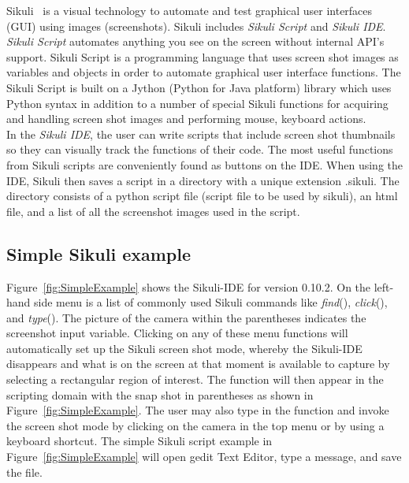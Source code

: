 \documentclass{InsightArticle}
\begin{document}
Sikuli~\cite{Sikuli:Documentation,Sikuli:Website,Yeh:2009:Sikuli} is a visual
technology to automate and test graphical user interfaces (GUI) using images
(screenshots). Sikuli includes \emph{Sikuli Script} and \emph{Sikuli IDE}.\\

\emph{Sikuli Script} automates anything you see on the screen without internal
API's support. Sikuli Script is a programming language that uses screen shot
images as variables and objects in order to automate graphical user interface
functions. The Sikuli Script is built on a Jython (Python for Java platform)
library which uses Python syntax in addition to a number of special Sikuli
functions for acquiring and handling screen shot images and performing mouse,
keyboard actions.\\

In the \emph{Sikuli IDE}, the user can write scripts that include screen shot
thumbnails so they can visually track the functions of their code. The most
useful functions from Sikuli scripts are conveniently found as
buttons on the IDE. When using the IDE, Sikuli then saves a script in a
directory with a unique extension .sikuli. The directory consists of a python
script file (script file to be used by sikuli), an html file, and a list of all
the screenshot images used in the script.


\subsection{Simple Sikuli example} %

Figure~\ref{fig:SimpleExample} shows the Sikuli-IDE for version 0.10.2. On the
left-hand side menu is a list of commonly used Sikuli commands
like \emph{find}(), \emph{click}(), and \emph{type}(). The picture of
the camera within the parentheses indicates the screenshot input variable.
Clicking on any of these menu functions will automatically set up the Sikuli
screen shot mode, whereby the Sikuli-IDE disappears and what is on the screen at
that moment is available to capture by selecting a rectangular region of
interest. The function will then appear in the scripting domain with the snap
shot in parentheses as shown in Figure~\ref{fig:SimpleExample}. The user may
also type in the function and invoke the screen shot mode by clicking on the
camera in the top menu or by using a keyboard shortcut. The simple Sikuli script
example in Figure~\ref{fig:SimpleExample} will open gedit Text Editor, type a
message, and save the file.
\end{document}
